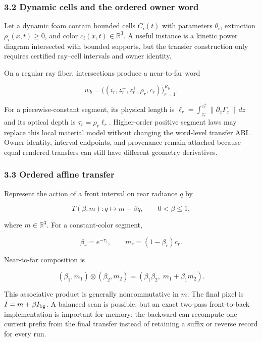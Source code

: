 \documentclass[
]{article}
\begin{document}
\subsubsection{3.2 Dynamic cells and the ordered owner
word}\label{dynamic-cells-and-the-ordered-owner-word}

Let a dynamic foam contain bounded cells \(C_i(t)\) with parameters
\(\theta_i\), extinction \(\rho_i(x,t)\ge0\), and color
\(c_i(x,t)\in\mathbb R^3\). A useful instance is a kinetic power diagram
intersected with bounded supports, but the transfer construction only
requires certified ray--cell intervals and owner identity.

On a regular ray fiber, intersections produce a near-to-far word

\[
w_b=\bigl((i_r,z_r^-,z_r^+,\rho_r,c_r)\bigr)_{r=1}^{R_b}.
\tag{4}
\]

For a piecewise-constant segment, its physical length is
\(\ell_r=\int_{z_r^-}^{z_r^+}
\|\partial_z\Gamma_x\|\,dz\) and its optical depth is
\(\tau_r=\rho_r\ell_r\). Higher-order positive segment laws may replace
this local material model without changing the word-level transfer ABI.
Owner identity, interval endpoints, and provenance remain attached
because equal rendered transfers can still have different geometry
derivatives.

\subsubsection{3.3 Ordered affine
transfer}\label{ordered-affine-transfer}

Represent the action of a front interval on rear radiance \(q\) by

\[
T(\beta,m):q\mapsto m+\beta q,
\qquad 0<\beta\le1,
\tag{5}
\]

where \(m\in\mathbb R^3\). For a constant-color segment,

\[
\beta_r=e^{-\tau_r},
\qquad
m_r=(1-\beta_r)c_r.
\tag{6}
\]

Near-to-far composition is

\[
(\beta_1,m_1)\otimes(\beta_2,m_2)
=\left(\beta_1\beta_2,\;m_1+\beta_1m_2\right).
\tag{7}
\]

This associative product is generally noncommutative in \(m\). The final
pixel is \(I=m+\beta I_{\rm bg}\). A balanced scan is possible, but an
exact two-pass front-to-back implementation is important for memory: the
backward can recompute one current prefix from the final transfer
instead of retaining a suffix or reverse record for every run.
\end{document}
